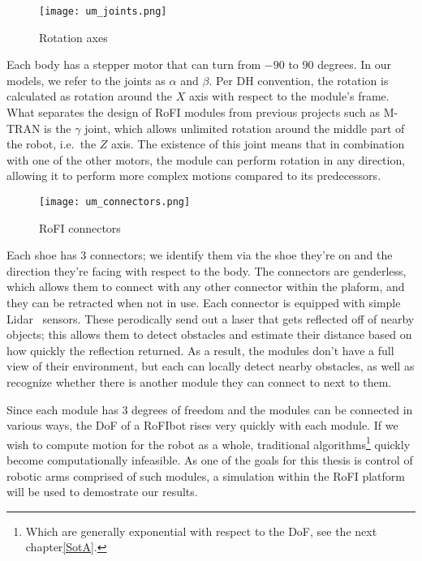 \begin{wrapfigure}{l}{0.3\textwidth}
    \centering
    \texttt{[image: um\_joints.png]}
  \caption{Rotation axes~\cite{rofiUm}}\label{fig:um_rot}
\end{wrapfigure}

Each body has a stepper motor that can turn from $-90$ to $90$ degrees. In our models, we refer to the joints as $\alpha$ and $\beta$. Per DH convention, the rotation is calculated as rotation around the $X$ axis with respect to the module's frame. What separates the design of RoFI modules from previous projects such as M-TRAN is the $\gamma$ joint, which allows unlimited rotation around the middle part of the robot, i.e.\ the $Z$ axis. The existence of this joint means that in combination with one of the other motors, the module can perform rotation in any direction, allowing it to perform more complex motions compared to its predecessors.

\begin{wrapfigure}{r}{0.3\textwidth}
    \centering
    \texttt{[image: um\_connectors.png]}
  \caption{RoFI connectors~\cite{rofiUm}}\label{fig:um_con}
\end{wrapfigure}

Each shoe has 3 connectors; we identify them via the shoe they're on and the direction they're facing with respect to the body. The connectors are genderless, which allows them to connect with any other connector within the plaform, and they can be retracted when not in use. Each connector is equipped with simple Lidar~\cite{Lidar} sensors. These perodically send out a laser that gets reflected off of nearby objects; this allows them to detect obstacles and estimate their distance based on how quickly the reflection returned. As a result, the modules don't have a full view of their environment, but each can locally detect nearby obstacles, as well as recognize whether there is another module they can connect to next to them.

Since each module has 3 degrees of freedom and the modules can be connected in various ways, the DoF of a RoFIbot rises very quickly with each module. If we wish to compute motion for the robot as a whole, traditional algorithms\footnote{Which are generally exponential with respect to the DoF, see the next chapter\ref{SotA}.} quickly become computationally infeasible. As one of the goals for this thesis is control of robotic arms comprised of such modules, a simulation within the RoFI platform will be used to demostrate our results.
